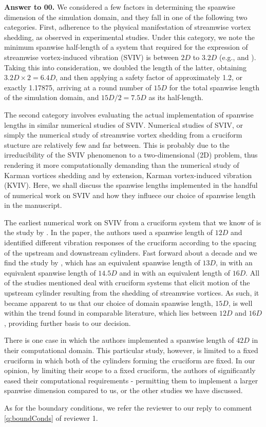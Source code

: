 \documentclass[12pt]{article}
\newcounter{question}
\newcommand{\name}{00}
\newcommand{\answer}[1]{\noindent \textbf{Answer to \name.\thequestion}\vskip 0.25cm \noindent #1 \mbox{}\\}
\begin{document}
\answer{
  We considered a few factors in determining the spanwise dimension of the simulation domain, and they fall in one of the following two categories. First, adherence to the physical manifestation of streamwise vortex shedding, as observed in experimental studies. Under this category, we note the minimum spanwise half-length of a system that required for the expression of streamwise vortex-induced vibration (SVIV) is between $2D$ to $3.2D$ (e.g., \citet{Shirakashi2001} and \citet{Koide2006}). Taking this into consideration, we doubled the length of the latter, obtaining $3.2D \times 2 = 6.4D$, and then applying a safety factor of approximately 1.2, or exactly 1.17875, arriving at a round number of $15D$ for the total spanwise length of the simulation domain, and $15D/2 = 7.5D$ as its half-length.

  The second category involves evaluating the actual implementation of spanwise lengths in similar numerical studies of SVIV. Numerical studies of SVIV, or simply the numerical study of streamwise vortex shedding from a cruciform stucture are relatively few and far between. This is probably due to the irreducibility of the SVIV phenomenon to a two-dimensional (2D) problem, thus rendering it more computationally demanding than the numerical study of Karman vortices shedding and by extension, Karman vortex-induced vibration (KVIV). Here, we shall discuss the spanwise lengths implemented in the handful of numerical work on SVIV and how they influece our choice of spanwise length in the manuscript.

  The earliest numerical work on SVIV from a cruciform system that we know of is the study by \citet{Deng2007}. In the paper, the authors used a spanwise length of $12D$ and identified different vibration responses of the cruciform according to the spacing of the upstream and downstream cylinders. Fast forward about a decade and we find the study by \citet{Hemsuwan2018a}, which has an equivalent spanwise length of $13D$, in \citet{Hemsuwan2018b} with an equivalent spanwise length of $14.5D$ and in \citet{Hemsuwan2018c} with an equivalent length of $16D$. All of the studies mentioned deal with cruciform systems that elicit motion of the upstream cylinder resulting from the shedding of streamwise vortices. As such, it became apparent to us that our choice of domain spanwise length, $15D$, is well within the trend found in comparable literature, which lies between $12D$ and $16D$, providing further basis to our decision.

  There is one case \citep{Zhao2018a} in which the authors implemented a spanwise length of $42D$ in their computational domain. This particular study, however, is limited to a fixed cruciform in which both of the cylinders forming the cruciform are fixed. In our opinion, by limiting their scope to a fixed cruciform, the authors of \citet{Zhao2018a} significantly eased their computational requirements - permitting them to implement a larger spanwise dimension compared to us, or the other studies we have discussed.

  As for the boundary conditions, we refer the reviewer to our reply to comment \ref{q:boundConds} of reviewer 1.
}
\end{document}

